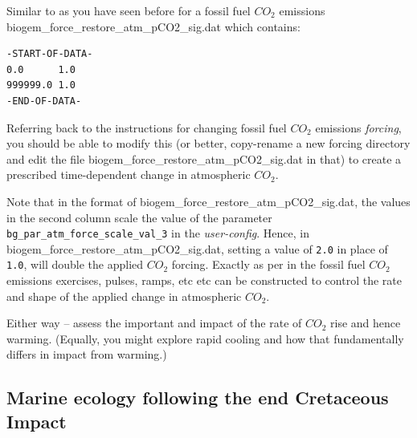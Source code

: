 \begin{enumerate}[noitemsep]
\newpage
%
Similar to as you have seen before for a fossil fuel \(CO_{2}\) emissions \\\textsf{\footnotesize biogem\_force\_restore\_atm\_pCO2\_sig.dat}
which contains:
\vspace{-1mm}\small\begin{verbatim}
-START-OF-DATA-
0.0      1.0
999999.0 1.0
-END-OF-DATA-
\end{verbatim}\normalsize\vspace{-1mm}

Referring back to the instructions for changing fossil fuel \(CO_{2}\) emissions \textit{forcing}, you should be able to modify this (or better, copy-rename a new forcing directory and edit the file \textsf{\footnotesize biogem\_force\_restore\_atm\_pCO2\_sig.dat} in that) to create a prescribed time-dependent change in atmospheric \(CO_{2}\).

Note that in the format of \textsf{\footnotesize biogem\_force\_restore\_atm\_pCO2\_sig.dat}, the values in the second column scale the value of the parameter \texttt{bg\_par\_atm\_force\_scale\_val\_3} in the \textit{user-config}. Hence, in \textsf{\footnotesize biogem\_force\_restore\_atm\_pCO2\_sig.dat}, setting a value of \texttt{2.0} in place of \texttt{1.0}, will double the applied \(CO_{2}\) forcing. Exactly as per in the fossil fuel \(CO_{2}\) emissions exercises, pulses, ramps, etc etc can be constructed to control the rate and shape of the applied change in atmospheric \(CO_{2}\).

\end{enumerate}

\vspace{2mm}

\noindent Either way --  assess the important and impact of the rate of \(CO_{2}\) rise and hence warming. (Equally, you might explore rapid cooling and how that fundamentally differs in impact from warming.)

\newpage
%
\subsection*{Marine ecology following the end Cretaceous Impact}





